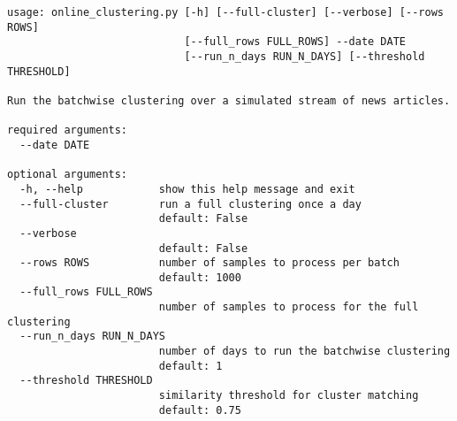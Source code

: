 \begin{lstlisting}[caption=Command line interface for the online clustering, label={lst:cli_online_clustering}]
    usage: online_clustering.py [-h] [--full-cluster] [--verbose] [--rows ROWS]
                            [--full_rows FULL_ROWS] --date DATE
                            [--run_n_days RUN_N_DAYS] [--threshold THRESHOLD]

Run the batchwise clustering over a simulated stream of news articles.

required arguments:
  --date DATE           

optional arguments:
  -h, --help            show this help message and exit
  --full-cluster        run a full clustering once a day
                        default: False
  --verbose             
                        default: False
  --rows ROWS           number of samples to process per batch
                        default: 1000
  --full_rows FULL_ROWS
                        number of samples to process for the full clustering
  --run_n_days RUN_N_DAYS
                        number of days to run the batchwise clustering
                        default: 1
  --threshold THRESHOLD
                        similarity threshold for cluster matching
                        default: 0.75

\end{lstlisting}

